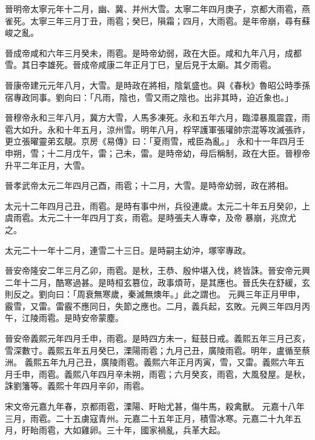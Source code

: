 \begin{pinyinscope}
 晉明帝太寧元年十二月，幽、冀、并州大雪。太寧二年四月庚子，京都大雨雹，燕雀死。太寧三年三月丁丑，雨雹；癸巳，隕霜；四月，大雨雹。是年帝崩，尋有蘇峻之亂。



 晉成帝咸和六年三月癸未，雨雹。是時帝幼弱，政在大臣。咸和九年八月，成都雪。其日李雄死。晉成帝咸康二年正月丁巳，皇后見于太廟。其夕雨雹。



 晉康帝建元元年八月，大雪。是時政在將相，陰氣盛也。與《春秋》魯昭公時季孫宿專政同事。劉向曰：「凡雨，陰也，雪又雨之陰也。出非其時，迫近象也。」



 晉穆帝永和三年八月，冀方大雪，人馬多凍死。永和五年六月，臨漳暴風震霆，雨雹大如升。永和十年五月，涼州雪。明年八月，桴罕護軍張瓘帥宗混等攻滅張祚，更立張曜靈弟玄靚。京房《易傳》曰：「夏雨雪，戒臣為亂。」
 永和十一年四月壬申朔，雪；十二月戊午，雷；己未，雷。是時帝幼，母后稱制，政在大臣。晉穆帝升平二年正月，大雪。



 晉孝武帝太元二年四月己酉，雨雹；十二月，大雪。是時帝幼弱，政在將相。



 太元十二年四月己丑，雨雹。是時有事中州，兵役連歲。太元二十年五月癸卯，上虞雨雹。太元二十一年四月丁亥，雨雹。是時張夫人專幸，及帝
 暴崩，兆庶尤之。



 太元二十一年十二月，連雪二十三日。是時嗣主幼沖，塚宰專政。



 晉安帝隆安二年三月乙卯，雨雹。是秋，王恭、殷仲堪入伐，終皆誅。晉安帝元興二年十二月，酷寒過甚。是時桓玄篡位，政事煩苛，是其應也。晉氏失在舒緩，玄則反之。劉向曰：「周衰無寒歲，秦滅無燠年。」此之謂也。
 元興三年正月甲申，霰雪，又雷。雷霰不應同日，失節之應也。二月，義兵起，玄敗。元興三年四月丙午，江陵雨雹。是時安帝蒙塵。



 晉安帝義熙元年四月壬申，雨雹。是時四方未一，鉦鼓日戒。義熙五年三月己亥，雪深數寸。義熙五年五月癸巳，溧陽雨雹；九月己丑，廣陵雨雹。明年，盧循至蔡洲。
 義熙五年九月己丑，廣陵雨雹。義熙六年正月丙寅，雪，又雷。義熙六年五月壬申，雨雹。義熙八年四月辛未朔，雨雹；六月癸亥，雨雹，大風發屋。是秋，誅劉籓等。義熙十年四月辛卯，雨雹。



 宋文帝元嘉九年春，京都雨雹，溧陽、盱眙尤甚，傷牛馬，殺禽獸。
 元嘉十八年三月，雨雹。二十五虜寇青州。元嘉二十五年正月，積雪冰寒。元嘉二十九年五月，盱眙雨雹，大如雞卵。三十年，國家禍亂，兵革大起。




\end{pinyinscope}
